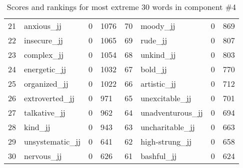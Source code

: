 \begin{table}[tbp]
\begin{tabular}{| rlr@{.}l | rlr@{.}l |}
    21 & anxious\_jj & 0 & 1076    &    70 & moody\_jj & 0 & 869 \\
    22 & insecure\_jj & 0 & 1065    &    69 & rude\_jj & 0 & 807 \\
    23 & complex\_jj & 0 & 1054    &    68 & unkind\_jj & 0 & 803 \\
    24 & energetic\_jj & 0 & 1032    &    67 & bold\_jj & 0 & 770 \\
    25 & organized\_jj & 0 & 1022    &    66 & artistic\_jj & 0 & 712 \\
    26 & extroverted\_jj & 0 & 971    &    65 & unexcitable\_jj & 0 & 701 \\
    27 & talkative\_jj & 0 & 962    &    64 & unadventurous\_jj & 0 & 694 \\
    28 & kind\_jj & 0 & 943    &    63 & uncharitable\_jj & 0 & 663 \\
    29 & unsystematic\_jj & 0 & 641    &    62 & high-strung\_jj & 0 & 658 \\
    30 & nervous\_jj & 0 & 626    &    61 & bashful\_jj & 0 & 624 \\
    \hline
    \end{tabular}
    \caption{Scores and rankings for most extreme 30 words in component \#4} 
\end{table}
\clearpage
